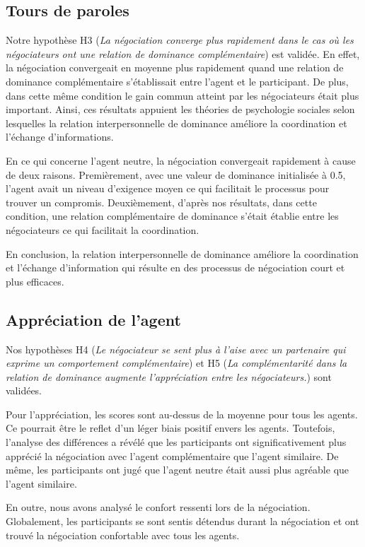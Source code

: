 	
	\subsection{Tours de paroles}
	Notre hypothèse H3 (\textit{La négociation converge plus rapidement dans le cas où les négociateurs ont une relation de dominance complémentaire}) est validée. En effet, la négociation convergeait en moyenne plus rapidement quand une relation de dominance complémentaire s'établissait entre l'agent et le participant. De plus, dans cette même condition le gain commun atteint par les négociateurs était plus important. Ainsi, ces résultats appuient les théories de  psychologie sociales selon lesquelles la relation interpersonnelle de dominance améliore la coordination et l'échange d'informations.
	
		
	En ce qui concerne l'agent neutre, la négociation convergeait rapidement à cause de deux raisons. Premièrement, avec une valeur de dominance initialisée à 0.5, l'agent avait un niveau d'exigence moyen ce qui facilitait le processus pour trouver un compromis. 
	Deuxièmement, d'après nos résultats, dans cette condition, une relation complémentaire de dominance s'était établie entre les négociateurs ce qui facilitait la coordination. 
	
	En conclusion, la relation interpersonnelle de dominance améliore la coordination et l'échange d'information qui résulte en des processus de négociation court et plus efficaces. 
	
	\subsection{Appréciation de l'agent}
	Nos hypothèses H4 (\textit{Le négociateur se sent plus à l'aise avec un partenaire qui exprime un comportement complémentaire})  et H5  (\textit{La complémentarité dans la relation de dominance augmente l'appréciation entre les négociateurs.}) sont validées. 
	
	Pour l’appréciation, les scores sont au-dessus de la moyenne pour tous les agents. Ce pourrait être le reflet d’un léger biais positif envers les agents. Toutefois, l'analyse des différences a révélé que les participants ont significativement plus apprécié la négociation avec l'agent complémentaire que l'agent similaire. De même, les participants ont jugé que l'agent neutre était aussi plus agréable que l'agent similaire. 
	
	En outre, nous avons analysé le confort ressenti lors de la négociation. Globalement, les participants se sont sentis détendus durant la négociation et ont trouvé la négociation confortable avec tous les agents.  
	
